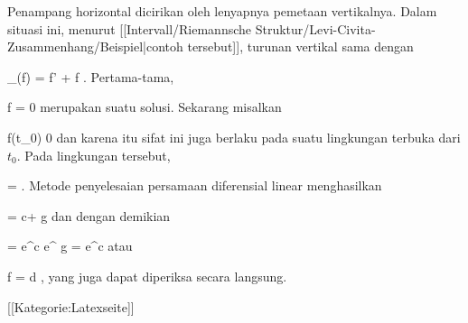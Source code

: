 Penampang horizontal dicirikan oleh lenyapnya pemetaan vertikalnya. Dalam situasi ini, menurut
[[Intervall/Riemannsche Struktur/Levi-Civita-Zusammenhang/Beispiel|contoh tersebut]],
turunan vertikal sama dengan

\mavergleichskettedisp
{\vergleichskette
{ \nabla_\partial (f)
}
{ =} { f' + f {  }
}
{ } {
}
{ } {
}
{ } {}
}
{}{}{.}
Pertama-tama,

\mavergleichskette
{\vergleichskette
{ f
}
{ = }{ 0
}
{  }{
}
{    }{
}
{   }{
}
}
{}{}{}
merupakan suatu solusi. Sekarang misalkan

\mavergleichskette
{\vergleichskette
{ f(t_0)
}
{ \neq }{ 0
}
{  }{
}
{    }{
}
{   }{
}
}
{}{}{}
dan karena itu sifat ini juga berlaku pada suatu lingkungan terbuka dari $t_0$. Pada lingkungan tersebut,

\mavergleichskettedisp
{\vergleichskette
{  {  }
}
{ =} { {  }
}
{ } {
}
{ } {
}
{ } {
}
}
{}{}{.}
Metode penyelesaian persamaan diferensial linear menghasilkan

\mavergleichskettedisp
{\vergleichskette
{   \ln  {}
}
{ =} { c+ {  }  \ln   g
}
{ } {
}
{ } {
}
{ } {
}
}
{}{}{}
dan dengan demikian

\mavergleichskettedisp
{\vergleichskette
{ 
}
{ =} { e^c e^{ {  }  \ln  g }
}
{ =} { e^c  
}
{ } {
}
{ } {
}
}
{}{}{}
atau

\mavergleichskettedisp
{\vergleichskette
{ f
}
{ =} { d 
}
{ } {
}
{ } {
}
{ } {
}
}
{}{}{}
 {} {,}
yang juga dapat diperiksa secara langsung.

 [[Kategorie:Latexseite]]
